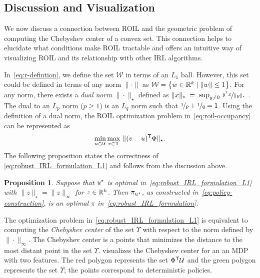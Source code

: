\documentclass[10pt]{article}
\renewcommand{\cite}{\citep}
\theoremstyle{plain}
\newtheorem{proposition}{Proposition}
\theoremstyle{remark}
\newcommand{\gersi}[1]{\textcolor{red}{[#1]}}
\begin{document}
\subsection{Discussion and Visualization}
\label{sec:geom-intu-reduct}

We now discuss a connection between ROIL and the geometric problem of computing the Chebyshev center of a convex set. This connection helps to elucidate what conditions make ROIL tractable and offers an intuitive way of visualizing ROIL and its relationship with other IRL algorithms. 

In~\eqref{eq:r-defintion}, we define the set $\mathcal{W}$ in terms of an $L_1$ ball. However, this set could be defined in terms of any norm $\| \cdot \|$ as $\mathcal{W} = \left\{ w\in \mathbb{R}^k \mid \| w \| \le 1 \right\}$.  For any norm, there exists a \emph{dual norm} $\| \cdot  \|_{\star}$ defined as \( \| x\|_{\star}\; =\;  \sup_{y \neq 0} \, \nicefrac{y ^{\mathsf{T}} x}{\|y\|} . \)~\cite{Horn2013}.
The dual to an $L_p$ norm ($p \ge 1$) is an $L_q$ norm such that $\nicefrac{1}{p} + \nicefrac{1}{q} = 1$. Using the definition of a dual norm, the ROIL optimization problem in~\eqref{eq:roil-occupancy} can be represented as
\begin{equation} \label{eq:robust_IRL_formulation_L1}
\min_{u \in \mathcal{U}} \max_{v \in \Upsilon} \, \|(v - u)^{\mathsf{T}} \Phi\|_{\star}.
\end{equation}
The following proposition states the correctness of \eqref{eq:robust_IRL_formulation_L1} and follows from the discussion above. 
\begin{proposition}
\label{thrm:chebeyshevRegret}
Suppose that $u^{\mathnormal{\star}}$ is optimal in~\eqref{eq:robust_IRL_formulation_L1} with $\| z  \|_{\star} = \| z \|_{\infty}$ for $z\in \mathbb{R}^k$. Then $\pi_{u^{\mathnormal{\star}}}$, as constructed in~\eqref{eq:policy-construction}, is an optimal $\pi$ in~\eqref{eq:robust_IRL_formulation}.
\end{proposition}

The optimization problem in~\eqref{eq:robust_IRL_formulation_L1} is equivalent to computing the \emph{Chebyshev center} of the set $\Upsilon$ with respect to the norm defined by $\| \cdot  \|_{\infty}$. The Chebyshev center is a points that minimizes the distance to the most distant point in the set $\Upsilon$.  visualizes the Chebyshev center for an an MDP with two features. The red polygon represents the set $\Phi^{\mathsf{T}} \mathcal{U}$ and the green polygon represents the set $\Upsilon$; the points correspond to deterministic policies.
\end{document}
